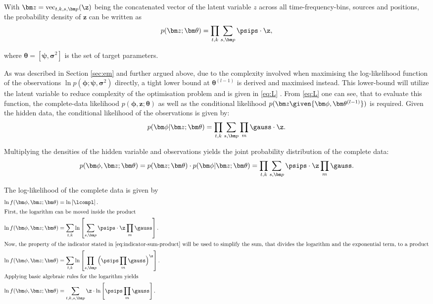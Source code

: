 With $\bm z=\text{vec}_{t,k,s,\bm p}(\z)$ being the concatenated vector of the latent variable $z$ across all time-frequency-bins, sources and positions, the probability density of $\bm z$ can be written as \begin{equation}
    p(\bm z;\bm\theta)=\prod_{t,k}\sum_{s,\bm p}\psips\cdot\z,
\end{equation}

where $\bm\theta=[\bm\psi,\bm\sigma^2]$ is the set of target parameters.

As was described in Section \ref{sec:em} and further argued above, due to the complexity involved when maximising the log-likelihood function of the observations $\ln p(\bm\phi;\bm\psi, \bm\sigma^2)$ directly, a tight lower bound at $\bm\theta^{(l-1)}$ is derived and maximised instead. This lower-bound will utilize the latent variable to reduce complexity of the optimisation problem and is given in \eqref{eq:L} . From \eqref{eq:L} one can see, that to evaluate this function, the complete-data likelihood $p(\bm\phi,\bm z; \bm\theta)$ as well as the conditional likelihood $p(\bm z\given{\bm\phi, \bm\theta^{(l-1)}})$ is required. Given the hidden data, the conditional likelihood of the observations is given by:
\begin{equation}
    p(\bm\phi |\bm z;\bm\theta)=\prod_{t,k}\sum_{s,\bm p}\prod_{m}\gauss\cdot\z.
\end{equation}

Multiplying the densities of the hidden variable and observations yields the joint probability distribution of the complete data:
\begin{equation}
    p(\bm\phi,\bm z;\bm\theta)=p(\bm z;\bm\theta)\cdot p(\bm\phi |\bm z;\bm\theta)=\prod_{t,k}\sum_{s,\bm p}\psips\cdot\z\prod_{m}\gauss .
\end{equation}

The log-likelihood of the complete data is given by
\begin{align}
    \ln f(\bm\phi,\bm z; \bm\theta) &= \ln \left [ \lcompl \right ].\\
    \intertext{First, the logarithm can be moved inside the product}
    \ln f(\bm\phi,\bm z; \bm\theta) &=\sum_{t,k}\ln \left [\sum_{s,\bm p}\psips\cdot\z\prod_{m}\gauss\right ].\\
    \intertext{Now, the property of the indicator stated in \eqref{eq:indicator-sum-product} will be used to simplify the sum, that divides the logarithm and the exponential term, to a product}
    \ln f(\bm\phi,\bm z; \bm\theta) &=\sum_{t,k}\ln \left [\prod_{s,\bm p}\Big (\psips\prod_{m}\gauss\Big )^{\z}\right ].\\
    \intertext{Applying basic algebraic rules for the logarithm yields}
    \label{eq:complete-data}
    \ln f(\bm\phi,\bm z; \bm\theta) &=\sum_{t,k,s,\bm p}\z\cdot\ln \left [\psips\prod_{m}\gauss\right ].
\end{align}

